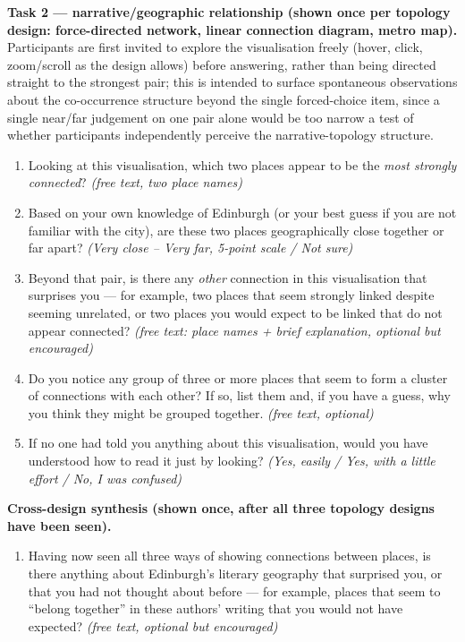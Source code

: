 \documentclass[logo,msc]{infthesis}
\begin{document}
\textbf{Task 2 --- narrative/geographic relationship (shown once per topology design: force-directed network, linear connection diagram, metro map).} Participants are first invited to explore the visualisation freely (hover, click, zoom/scroll as the design allows) before answering, rather than being directed straight to the strongest pair; this is intended to surface spontaneous observations about the co-occurrence structure beyond the single forced-choice item, since a single near/far judgement on one pair alone would be too narrow a test of whether participants independently perceive the narrative-topology structure.
\begin{enumerate}
  \item Looking at this visualisation, which two places appear to be the \emph{most strongly connected}? \emph{(free text, two place names)}
  \item Based on your own knowledge of Edinburgh (or your best guess if you are not familiar with the city), are these two places geographically close together or far apart? \emph{(Very close -- Very far, 5-point scale / Not sure)}
  \item Beyond that pair, is there any \emph{other} connection in this visualisation that surprises you --- for example, two places that seem strongly linked despite seeming unrelated, or two places you would expect to be linked that do not appear connected? \emph{(free text: place names + brief explanation, optional but encouraged)}
  \item Do you notice any group of three or more places that seem to form a cluster of connections with each other? If so, list them and, if you have a guess, why you think they might be grouped together. \emph{(free text, optional)}
  \item If no one had told you anything about this visualisation, would you have understood how to read it just by looking? \emph{(Yes, easily / Yes, with a little effort / No, I was confused)}
\end{enumerate}

\textbf{Cross-design synthesis (shown once, after all three topology designs have been seen).}
\begin{enumerate}
  \item Having now seen all three ways of showing connections between places, is there anything about Edinburgh's literary geography that surprised you, or that you had not thought about before --- for example, places that seem to ``belong together'' in these authors' writing that you would not have expected? \emph{(free text, optional but encouraged)}
\end{enumerate}
\end{document}

